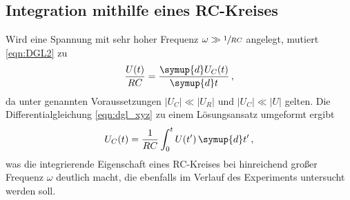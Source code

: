\subsection{Integration mithilfe eines RC-Kreises}
Wird eine Spannung mit sehr hoher Frequenz $\omega \gg \sfrac{1}{RC}$ angelegt, mutiert \eqref{eqn:DGL2} zu
\begin{equation}
    \frac{U(t)}{RC}=\frac{\symup{d}U_C(t)}{\symup{d}t} \,,
    \label{eqn:dgl_xyz}
\end{equation}
da unter genannten Voraussetzungen ${\lvert U_C\rvert\ll\lvert U_R\rvert}$ und ${\lvert U_C\rvert\ll\lvert U\rvert}$ gelten. 
Die Differentialgleichung \eqref{eqn:dgl_xyz} zu einem Lösungsansatz umgeformt ergibt 
\begin{equation}
    U_C(t)=\frac{1}{RC} \int_0^t U(t') \,\symup{d}t'\,,
\end{equation}
was die integrierende Eigenschaft eines RC-Kreises bei hinreichend großer Frequenz $\omega$ deutlich macht, die ebenfalls 
im Verlauf des Experiments untersucht werden soll. 